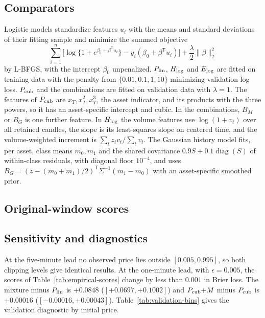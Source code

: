 \subsection{Comparators}
Logistic models standardize features $u_i$ with the means and standard deviations of their fitting sample and minimize the summed objective
\[
 \sum_{i=1}^n\bigl[\log\{1+e^{\beta_0+\beta^{\mathsf T}u_i}\}-y_i(\beta_0+\beta^{\mathsf T}u_i)\bigr]+\frac\lambda2\|\beta\|_2^2
\]
by L-BFGS, with the intercept $\beta_0$ unpenalized. $P_{\rm lin}$, $H_{\rm log}$ and $E_{\rm log}$ are fitted on training data with the penalty from $\{0.01,0.1,1,10\}$ minimizing validation log loss. $P_{\rm cub}$ and the combinations are fitted on validation data with $\lambda=1$. The features of $P_{\rm cub}$ are $x_T,x_T^2,x_T^3$, the asset indicator, and its products with the three powers, so it has an asset-specific intercept and cubic. In the combinations, $B_M$ or $B_G$ is one further feature. In $H_{\rm log}$ the volume features use $\log(1+v_t)$ over all retained candles, the slope is its least-squares slope on centered time, and the volume-weighted increment is $\sum_tz_tv_t/\sum_tv_t$. The Gaussian history model fits, per asset, class means $m_0,m_1$ and the shared covariance $0.9S+0.1\operatorname{diag}(S)$ of within-class residuals, with diagonal floor $10^{-4}$, and uses $B_G=(z-(m_0+m_1)/2)^{\mathsf T}\Sigma^{-1}(m_1-m_0)$ with an asset-specific smoothed prior.

\subsection{Original-window scores}
\begin{table}[h]
\caption{Held-out losses on the same 664 contracts at each lead (14 UTC dates, 332 contracts per asset). Lower is better. Names follow Table~\ref{tab:infosets}.}
\label{tab:empirical-scores}
\centering\scriptsize

\end{table}

\subsection{Sensitivity and diagnostics}
At the five-minute lead no observed price lies outside $[0.005,0.995]$, so both clipping levels give identical results. At the one-minute lead, with $\epsilon=0.005$, the scores of Table~\ref{tab:empirical-scores} change by less than $0.001$ in Brier loss. The mixture minus $P_{\rm lin}$ is $+0.0848$ ($[+0.0697,+0.1002]$) and $P_{\rm cub}{+}M$ minus $P_{\rm cub}$ is $+0.00016$ ($[-0.00016,+0.00043]$). Table~\ref{tab:validation-bins} gives the validation diagnostic by initial price.


